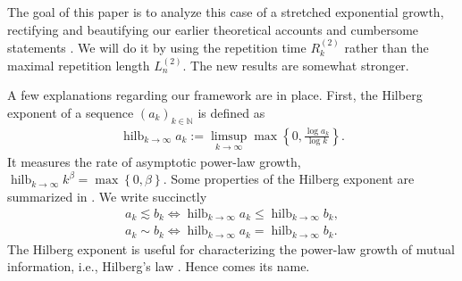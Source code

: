 \documentclass[a4paper,12pt]{article}
\newcommand{\klam}[1]{\left\{ #1 \right\}}
\DeclareMathOperator*{\hilberg}{hilb}
\begin{document}
The goal of this paper is to analyze this case of a stretched
exponential growth, rectifying and beautifying our earlier theoretical
accounts and cumbersome statements
\citep{Debowski15f,Debowski18b,Debowski21}. We will do it by using the
repetition time $R^{(2)}_k$ rather than the maximal repetition length
$L^{(2)}_n$. The new results are somewhat stronger.


A few explanations regarding our framework are in place.  First, the
Hilberg exponent of a sequence $(a_k)_{k\in\mathbb{N}}$ is defined as
\begin{align}
  \label{Exponent}
  \hilberg_{k\rightarrow\infty} a_k
  :=\limsup_{k\rightarrow\infty} \max\klam{0,\frac{\log
  a_k}{\log k}}
  .
\end{align}
It measures the rate of asymptotic power-law growth,
$\hilberg_{k\rightarrow\infty} k^\beta=\max\klam{0,\beta}$. Some
properties of the Hilberg exponent are summarized in \citep[Section
8.1]{Debowski21}. We write succinctly
\begin{align}
  a_k\lesssim b_k\iff
  \hilberg_{k\rightarrow\infty} a_k\le
  \hilberg_{k\rightarrow\infty} b_k,
  \\
  a_k\sim b_k\iff
  \hilberg_{k\rightarrow\infty} a_k=
  \hilberg_{k\rightarrow\infty} b_k.
\end{align}
The Hilberg exponent is useful for characterizing the power-law growth
of mutual information, i.e., Hilberg's law \citep[Chapter
8]{Debowski21}. Hence comes its name.
\end{document}
